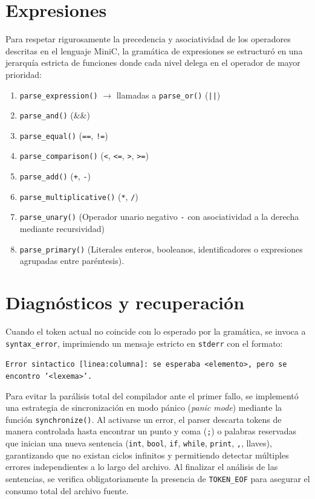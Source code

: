 \documentclass[12pt, letterpaper]{article}
\begin{document}
\section{Expresiones}
Para respetar rigurosamente la precedencia y asociatividad de los operadores descritas en el lenguaje MiniC, la gramática de expresiones se estructuró en una jerarquía estricta de funciones donde cada nivel delega en el operador de mayor prioridad:
\begin{enumerate}
    \item \texttt{parse\_expression()} $\to$ llamadas a \texttt{parse\_or()} (\texttt{||})
    \item \texttt{parse\_and()} (\&\&)
    \item \texttt{parse\_equal()} (\texttt{==}, \texttt{!=})
    \item \texttt{parse\_comparison()} (\texttt{<}, \texttt{<=}, \texttt{>}, \texttt{>=})
    \item \texttt{parse\_add()} (\texttt{+}, \texttt{-})
    \item \texttt{parse\_multiplicative()} (\texttt{*}, \texttt{/})
    \item \texttt{parse\_unary()} (Operador unario negativo \texttt{-} con asociatividad a la derecha mediante recursividad)
    \item \texttt{parse\_primary()} (Literales enteros, booleanos, identificadores o expresiones agrupadas entre paréntesis).
\end{enumerate}

\section{Diagnósticos y recuperación}
Cuando el token actual no coincide con lo esperado por la gramática, se invoca a \texttt{syntax\_error}, imprimiendo un mensaje estricto en \texttt{stderr} con el formato:
\begin{center}
    \texttt{Error sintactico [linea:columna]: se esperaba <elemento>, pero se encontro '<lexema>'.}
\end{center}
Para evitar la parálisis total del compilador ante el primer fallo, se implementó una estrategia de sincronización en modo pánico (\textit{panic mode}) mediante la función \texttt{synchronize()}. Al activarse un error, el parser descarta tokens de manera controlada hasta encontrar un punto y coma (\texttt{;}) o palabras reservadas que inician una nueva sentencia (\texttt{int}, \texttt{bool}, \texttt{if}, \texttt{while}, \texttt{print}, \texttt{,}, llaves), garantizando que no existan ciclos infinitos y permitiendo detectar múltiples errores independientes a lo largo del archivo. Al finalizar el análisis de las sentencias, se verifica obligatoriamente la presencia de \texttt{TOKEN\_EOF} para asegurar el consumo total del archivo fuente.
\end{document}
